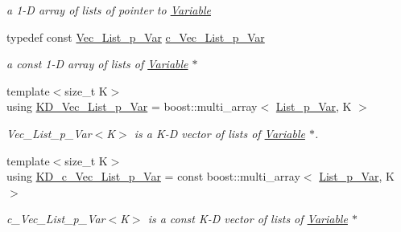 \begin{DoxyCompactItemize}
\begin{DoxyCompactList}\small\item\em a 1-\/D array of lists of pointer to \mbox{\hyperlink{class_s_m_spp__di__unipi__it_1_1_variable}{Variable}} \end{DoxyCompactList}\item 
typedef const \mbox{\hyperlink{group___variable___t_y_p_e_s_ga5c28c8956e72a58b668b86adad8c7805}{Vec\+\_\+\+List\+\_\+p\+\_\+\+Var}} \mbox{\hyperlink{group___variable___t_y_p_e_s_ga5419498ee46468a022e7234342622423}{c\+\_\+\+Vec\+\_\+\+List\+\_\+p\+\_\+\+Var}}
\begin{DoxyCompactList}\small\item\em a const 1-\/D array of lists of \mbox{\hyperlink{class_s_m_spp__di__unipi__it_1_1_variable}{Variable}} $\ast$ \end{DoxyCompactList}\item 
{\footnotesize template$<$size\+\_\+t K$>$ }\\using \mbox{\hyperlink{group___variable___t_y_p_e_s_gaf0ca613b1f488591d43c188ab5e94323}{K\+D\+\_\+\+Vec\+\_\+\+List\+\_\+p\+\_\+\+Var}} = boost\+::multi\+\_\+array$<$ \mbox{\hyperlink{group___variable___t_y_p_e_s_ga1fccfcb7d57847e2b9ba2fa0c6100b80}{List\+\_\+p\+\_\+\+Var}}, K $>$
\begin{DoxyCompactList}\small\item\em Vec\+\_\+\+List\+\_\+p\+\_\+\+Var$<$\+K$>$ is a K-\/D vector of lists of \mbox{\hyperlink{class_s_m_spp__di__unipi__it_1_1_variable}{Variable}} $\ast$. \end{DoxyCompactList}\item 
{\footnotesize template$<$size\+\_\+t K$>$ }\\using \mbox{\hyperlink{group___variable___t_y_p_e_s_ga9d7332f91da35bffa8fb8a96b3c3702d}{K\+D\+\_\+c\+\_\+\+Vec\+\_\+\+List\+\_\+p\+\_\+\+Var}} = const boost\+::multi\+\_\+array$<$ \mbox{\hyperlink{group___variable___t_y_p_e_s_ga1fccfcb7d57847e2b9ba2fa0c6100b80}{List\+\_\+p\+\_\+\+Var}}, K $>$
\begin{DoxyCompactList}\small\item\em c\+\_\+\+Vec\+\_\+\+List\+\_\+p\+\_\+\+Var$<$\+K$>$ is a const K-\/D vector of lists of \mbox{\hyperlink{class_s_m_spp__di__unipi__it_1_1_variable}{Variable}} $\ast$ \end{DoxyCompactList}\end{DoxyCompactItemize}
